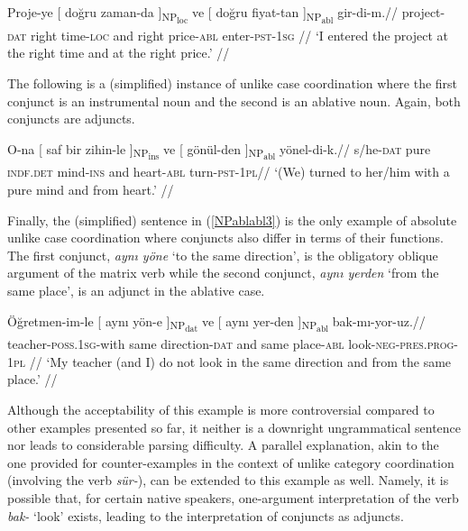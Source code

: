\pex[glspace=!1em,everygla={},everyglb={},aboveglbskip=-.15ex, interpartskip=15pt]
\label{NPablabl1} \begingl
\gla Proje-ye {[} doğru {zaman-da ]\textsubscript{NP\textsubscript{loc}}} ve {[} doğru {fiyat-tan ]\textsubscript{NP\textsubscript{abl}}} gir-di-m.//
\glb project-\textsc{dat} right time-\textsc{loc} and right price-\textsc{abl} enter-\textsc{pst}-\textsc{1sg} //
\glft `I entered the project at the right time and at the right price.' //
\endgl
\xe 

The following is a (simplified) instance of unlike case coordination where the first conjunct is an instrumental noun and the second is an ablative noun. Again, both conjuncts are adjuncts.

\pex[glspace=!1em,everygla={},everyglb={},aboveglbskip=-.15ex, interpartskip=15pt]
\label{NPablabl2} \begingl
\gla O-na {[} saf bir {zihin-le ]\textsubscript{NP\textsubscript{ins}}} ve {[} {gönül-den ]\textsubscript{NP\textsubscript{abl}}} yönel-di-k.//
\glb s/he-\textsc{dat} pure \textsc{indf.det} mind-\textsc{ins} and heart-\textsc{abl} turn-\textsc{pst}-\textsc{1pl}//
\glft `(We) turned to her/him with a pure mind and from heart.' //
\endgl
\xe 

Finally, the (simplified)  sentence in (\ref{NPablabl3}) is the only example of absolute unlike case coordination where conjuncts also differ in terms of their functions. The first conjunct, \textit{aynı yöne} `to the same direction', is the obligatory oblique argument of the matrix verb while the second conjunct, \textit{aynı yerden} `from the same place', is an adjunct in the ablative case. 

\pex[glspace=!1em,everygla={},everyglb={},aboveglbskip=-.15ex, interpartskip=15pt]
\label{NPablabl3} \begingl
\gla Öğretmen-im-le {[} aynı {yön-e ]\textsubscript{NP\textsubscript{dat}}} ve {[} aynı {yer-den ]\textsubscript{NP\textsubscript{abl}}} bak-mı-yor-uz.//
\glb teacher-\textsc{poss.1sg}-with same direction-\textsc{dat} and same place-\textsc{abl} look-\textsc{neg}-\textsc{pres.prog}-\textsc{1pl} //
\glft `My teacher (and I) do not look in the same direction and from the same place.' //
\endgl
\xe 

Although the acceptability of this example is more controversial compared to other examples presented so far, it neither is a downright ungrammatical sentence nor leads to considerable parsing difficulty. A parallel explanation, akin to the one provided for counter-examples in the context of unlike category coordination (involving the verb \textit{sür-}), can be extended to this example as well. Namely, it is possible that, for certain native speakers, one-argument interpretation of the verb \textit{bak-} `look' exists, leading to the interpretation of conjuncts as adjuncts.


